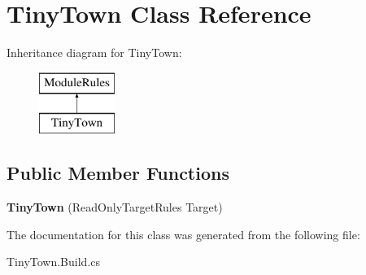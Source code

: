 \hypertarget{class_tiny_town}{}\section{Tiny\+Town Class Reference}
\label{class_tiny_town}
Inheritance diagram for Tiny\+Town\+:\begin{figure}[H]
\begin{center}
\leavevmode
\includegraphics[height=2.000000cm]{class_tiny_town}
\end{center}
\end{figure}
\subsection*{Public Member Functions}
\begin{DoxyCompactItemize}
\item 
\mbox{\label{class_tiny_town_ac4c1021223655d2d469a158f58ab19ba}} 
{\bfseries Tiny\+Town} (Read\+Only\+Target\+Rules Target)
\end{DoxyCompactItemize}


The documentation for this class was generated from the following file\+:\begin{DoxyCompactItemize}
\item 
Tiny\+Town.\+Build.\+cs\end{DoxyCompactItemize}
